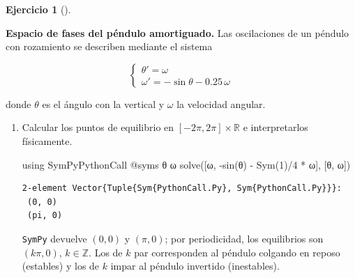 \documentclass[
  spanish,
  a4paper,
]{scrreport}
\newenvironment{Shaded}{\begin{snugshade}}{\end{snugshade}}
\newcommand{\BuiltInTok}[1]{\textcolor[rgb]{0.00,0.23,0.31}{#1}}
\newcommand{\FloatTok}[1]{\textcolor[rgb]{0.68,0.00,0.00}{#1}}
\newcommand{\FunctionTok}[1]{\textcolor[rgb]{0.28,0.35,0.67}{#1}}
\newcommand{\ImportTok}[1]{\textcolor[rgb]{0.00,0.46,0.62}{#1}}
\newcommand{\NormalTok}[1]{\textcolor[rgb]{0.00,0.23,0.31}{#1}}
\newcommand{\OperatorTok}[1]{\textcolor[rgb]{0.37,0.37,0.37}{#1}}
\newcommand{\PreprocessorTok}[1]{\textcolor[rgb]{0.68,0.00,0.00}{#1}}
\theoremstyle{definition}
\newtheorem{exercise}{Ejercicio}[chapter]
\theoremstyle{remark}
\begin{document}
\begin{exercise}[]\protect\hypertarget{exr-espacio-fases-pendulo}{}\label{exr-espacio-fases-pendulo}

\textbf{Espacio de fases del péndulo amortiguado.} Las oscilaciones de
un péndulo con rozamiento se describen mediante el sistema

\[
\begin{cases}
\theta' = \omega \\
\omega' = -\sin\theta - 0.25\,\omega
\end{cases}
\]

donde \(\theta\) es el ángulo con la vertical y \(\omega\) la velocidad
angular.

\begin{enumerate}
\def\labelenumi{\alph{enumi}.}
\item
  Calcular los puntos de equilibrio en \([-2\pi, 2\pi]\times\mathbb{R}\)
  e interpretarlos físicamente.

  \begin{tcolorbox}[enhanced jigsaw, arc=.35mm, bottomrule=.15mm, bottomtitle=1mm, breakable, colback=white, colbacktitle=quarto-callout-tip-color!10!white, colframe=quarto-callout-tip-color-frame, coltitle=black, left=2mm, leftrule=.75mm, opacityback=0, opacitybacktitle=0.6, rightrule=.15mm, title=\textcolor{quarto-callout-tip-color}{\faLightbulb}\hspace{0.5em}{Solución}, titlerule=0mm, toprule=.15mm, toptitle=1mm]

\begin{Shaded}
\begin{Highlighting}[]
\ImportTok{using} \BuiltInTok{SymPyPythonCall}
\PreprocessorTok{@syms}\NormalTok{ θ ω}
\FunctionTok{solve}\NormalTok{([ω, }\FunctionTok{{-}sin}\NormalTok{(θ) }\OperatorTok{{-}} \FunctionTok{Sym}\NormalTok{(}\FloatTok{1}\NormalTok{)}\OperatorTok{/}\FloatTok{4} \OperatorTok{*}\NormalTok{ ω], [θ, ω])}
\end{Highlighting}
\end{Shaded}

\begin{verbatim}
2-element Vector{Tuple{Sym{PythonCall.Py}, Sym{PythonCall.Py}}}:
 (0, 0)
 (pi, 0)
\end{verbatim}

  \texttt{SymPy} devuelve \((0,0)\) y \((\pi, 0)\); por periodicidad,
  los equilibrios son \((k\pi, 0)\), \(k\in\mathbb{Z}\). Los de \(k\)
  par corresponden al péndulo colgando en reposo (estables) y los de
  \(k\) impar al péndulo invertido (inestables).


\end{tcolorbox}
\end{enumerate}
\end{exercise}
\end{document}
